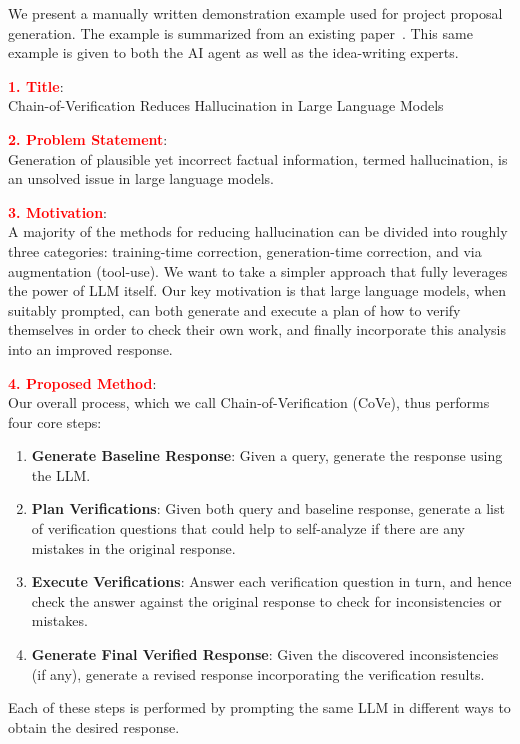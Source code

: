 We present a manually written demonstration example used for project proposal generation. The example is summarized from an existing paper~\cite{Dhuliawala2023ChainofVerificationRH}. This same example is given to both the AI agent as well as the idea-writing experts. 

\vspace{8pt}

\textbf{\textcolor{red}{1. Title}}: \\
Chain-of-Verification Reduces Hallucination in Large Language Models 

\textbf{\textcolor{red}{2. Problem Statement}}: \\
Generation of plausible yet incorrect factual information, termed hallucination, is an unsolved issue in large language models. 

\textbf{\textcolor{red}{3. Motivation}}: \\
A majority of the methods for reducing hallucination can be divided into roughly three categories: training-time correction, generation-time correction, and via augmentation (tool-use). We want to take a simpler approach that fully leverages the power of LLM itself. Our key motivation is that large language models, when suitably prompted, can both generate and execute a plan of how to verify themselves in order to check their own work, and finally incorporate this analysis into an improved response. 

\textbf{\textcolor{red}{4. Proposed Method}}: \\
Our overall process, which we call Chain-of-Verification (CoVe), thus performs four core steps:
\begin{enumerate}[label=(\arabic*), topsep=0pt, itemsep=0pt]
    \item \textbf{Generate Baseline Response}: Given a query, generate the response using the LLM.
    \item \textbf{Plan Verifications}: Given both query and baseline response, generate a list of verification questions that could help to self-analyze if there are any mistakes in the original response.
    \item \textbf{Execute Verifications}: Answer each verification question in turn, and hence check the answer against the original response to check for inconsistencies or mistakes.
    \item \textbf{Generate Final Verified Response}: Given the discovered inconsistencies (if any), generate a revised response incorporating the verification results.
\end{enumerate}
Each of these steps is performed by prompting the same LLM in different ways to obtain the desired response. 


